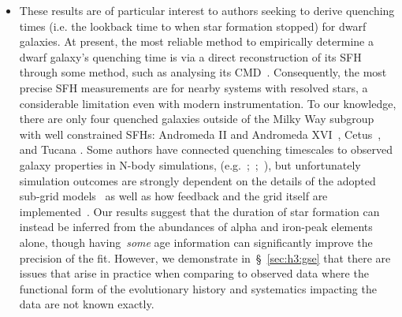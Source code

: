 \documentclass[ms.tex]{subfiles}
\begin{document}
\begin{itemize}
	\item These results are of particular interest to authors seeking to derive
	quenching times (i.e. the lookback time to when star formation stopped) for
	dwarf galaxies.
	At present, the most reliable method to empirically determine a dwarf
	galaxy's quenching time is via a direct reconstruction of its SFH through
	some method, such as analysing its CMD~\citep[e.g.][]{Sohn2013, Weisz2015}.
	Consequently, the most precise SFH measurements are for nearby systems with
	resolved stars, a considerable limitation even with modern instrumentation.
	To our knowledge, there are only four quenched galaxies outside of the
	Milky Way subgroup with well constrained SFHs: Andromeda II and Andromeda
	XVI~\citep{Weisz2014a}, Cetus~\citep{Monelli2010a}, and Tucana
	\citep{Monelli2010b}.
	Some authors have connected quenching timescales to observed galaxy
	properties in N-body simulations, (e.g.~\citealp{Phillips2014,
	Phillips2015};~\citealp*{Rocha2012};~\citealp{Slater2013, Slater2014,
	Wheeler2014}), but unfortunately simulation outcomes are strongly dependent
	on the details of the adopted sub-grid models~\citep[e.g.][]{Li2020} as
	well as how feedback and the grid itself are implemented~\citep{Hu2022}.
	Our results suggest that the duration of star formation can instead be
	inferred from the abundances of alpha and iron-peak elements alone, though
	having~\textit{some} age information can significantly improve the
	precision of the fit.
	However, we demonstrate in~\S~\ref{sec:h3:gse} that there are issues that
	arise in practice when comparing to observed data where the functional form
	of the evolutionary history and systematics impacting the data are not
	known exactly.



\end{itemize}
\end{document}
